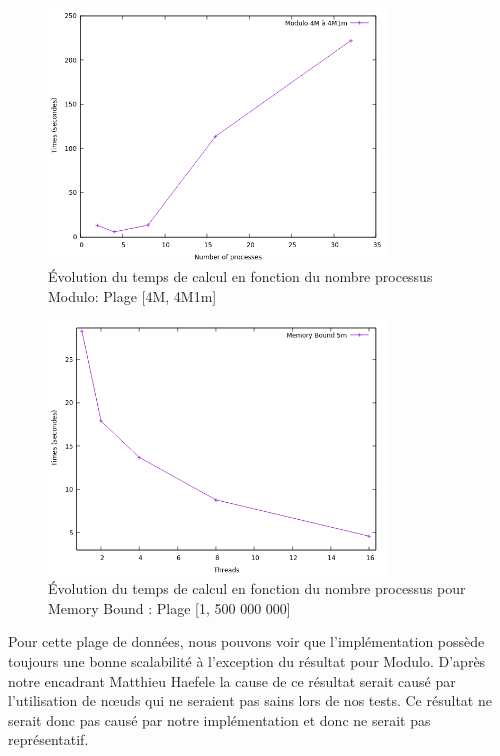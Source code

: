 \begin{figure}
            \centering 
            \includegraphics[width=0.8\textwidth]{Modulo_4M.png}
        \caption[ Évolution du temps de calcul en fonction du nombre processus]
        {\small Évolution du temps de calcul en fonction du nombre processus Modulo: Plage [4M, 4M1m]} 
        \label{fig:5}
\end{figure}
	
\begin{figure}
        \centering 
            \includegraphics[width=0.8\textwidth]{Memory.png}
        \caption[Évolution du temps de calcul en fonction du nombre processus]
        {\small Évolution du temps de calcul en fonction du nombre processus pour Memory Bound : Plage [1, 500 000 000]} 
        \label{fig:6}
\end{figure}

	Pour cette plage de données, nous pouvons voir que l'implémentation possède toujours une bonne scalabilité à l'exception du résultat pour Modulo. D'après notre encadrant Matthieu Haefele la cause de ce résultat serait causé par l'utilisation de nœuds qui ne seraient pas sains lors de nos tests. Ce résultat ne serait donc pas causé par notre implémentation et donc ne serait pas représentatif.\\
	
